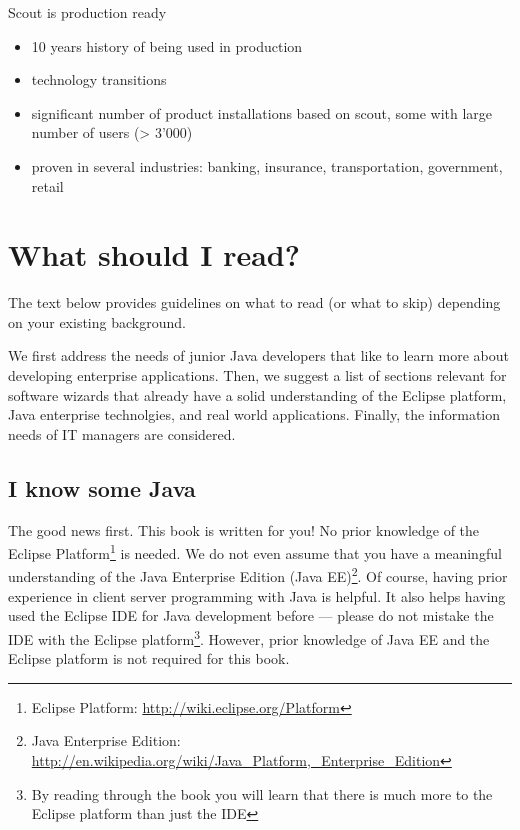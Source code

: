 \documentclass[a4paper,10pt,twoside]{book}
\begin{document}
Scout is production ready
\begin{itemize}
  \item 10 years history of being used in production
  \item technology transitions
  \item significant number of product installations based on scout, some with large number of users (> 3'000)
  \item proven in several industries: banking, insurance, transportation, government, retail
\end{itemize}

\section{What should I read?} 

The text below provides guidelines on what to read (or what to skip) depending on your existing background.

We first address the needs of junior Java developers that like to learn more about developing enterprise applications.
Then, we suggest a list of sections relevant for software wizards that already have a solid understanding of the Eclipse platform, Java enterprise technolgies, and real world applications.
Finally, the information needs of IT managers are considered.

\subsection{I know some Java}

The good news first.
This book is written for you! 
No prior knowledge of the Eclipse Platform\footnote{Eclipse Platform: \url{http://wiki.eclipse.org/Platform}} is needed. 
We do not even assume that you have a meaningful understanding of the Java Enterprise Edition 
(Java EE)\footnote{Java Enterprise Edition: \url{http://en.wikipedia.org/wiki/Java_Platform,_Enterprise_Edition}}.
Of course, having prior experience in client server programming with Java is helpful.
It also helps having used the Eclipse IDE for Java development before --- please do not mistake the IDE with the Eclipse 
platform\footnote{By reading through the book you will learn that there is much more to the Eclipse platform than just the IDE}.
However, prior knowledge of Java EE and the Eclipse platform is not required for this book.
\end{document}
